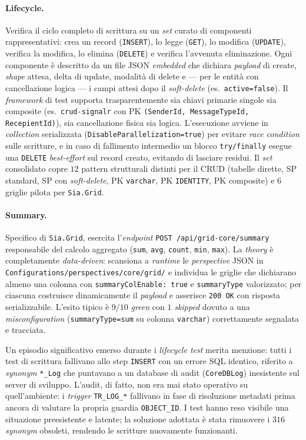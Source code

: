 \paragraph{Lifecycle.} Verifica il ciclo completo di scrittura su un \emph{set}
curato di componenti rappresentativi: crea un record (\texttt{INSERT}), lo legge
(\texttt{GET}), lo modifica (\texttt{UPDATE}), verifica la modifica, lo elimina
(\texttt{DELETE}) e verifica l'avvenuta eliminazione. Ogni componente è descritto
da un file JSON \emph{embedded} che dichiara \emph{payload} di create, \emph{shape}
attesa, delta di update, modalità di delete e --- per le entità con cancellazione
logica --- i campi attesi dopo il \emph{soft-delete} (es.\ \texttt{active=false}). Il
\emph{framework} di test supporta trasparentemente sia chiavi primarie singole sia
composite (es.\ \texttt{crud-signalr} con PK \texttt{(SenderId, MessageTypeId,
RecepientId)}), sia cancellazione fisica sia logica. L'esecuzione avviene in
\emph{collection} serializzata (\texttt{DisableParallelization=true}) per evitare
\emph{race condition} sulle scritture, e in caso di fallimento intermedio un blocco
\texttt{try/finally} esegue una \texttt{DELETE} \emph{best-effort} sul record creato,
evitando di lasciare residui. Il \emph{set} consolidato copre $12$ pattern
strutturali distinti per il CRUD (tabelle dirette, SP standard, SP con \emph{soft-delete},
PK \texttt{varchar}, PK \texttt{IDENTITY}, PK composite) e $6$ griglie pilota per
\texttt{Sia.Grid}.

\paragraph{Summary.} Specifico di \texttt{Sia.Grid}, esercita l'\emph{endpoint}
\texttt{POST /api/grid-core/summary} responsabile del calcolo aggregato
(\texttt{sum}, \texttt{avg}, \texttt{count}, \texttt{min}, \texttt{max}). La
\emph{theory} è completamente \emph{data-driven}: scansiona a \emph{runtime} le
\emph{perspective} JSON in \texttt{Configurations/perspectives/core/grid/} e
individua le griglie che dichiarano almeno una colonna con
\texttt{summaryColEnable: true} e \texttt{summaryType} valorizzato; per ciascuna
costruisce dinamicamente il \emph{payload} e asserisce \texttt{200 OK} con risposta
serializzabile. L'esito tipico è $9/10$ \emph{green} con $1$ \emph{skipped} dovuto a
una \emph{misconfiguration} (\texttt{summaryType=sum} su colonna \texttt{varchar})
correttamente segnalata e tracciata.

Un episodio significativo emerso durante i \emph{lifecycle test} merita menzione:
tutti i test di scrittura fallivano allo step \texttt{INSERT} con un errore SQL
identico, riferito a \emph{synonym} \texttt{*\_Log} che puntavano a un database di
audit (\texttt{CoreDBLog}) inesistente sul server di sviluppo. L'audit, di fatto,
non era mai stato operativo su quell'ambiente: i \emph{trigger} \texttt{TR\_LOG\_*}
fallivano in fase di risoluzione metadati prima ancora di valutare la propria
guardia \texttt{OBJECT\_ID}. I test hanno reso visibile una situazione preesistente
e latente; la soluzione adottata è stata rimuovere i $316$ \emph{synonym} obsoleti,
rendendo le scritture nuovamente funzionanti.

